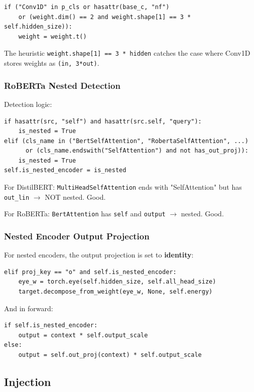 \begin{lstlisting}
if ("Conv1D" in p_cls or hasattr(base_c, "nf")
    or (weight.dim() == 2 and weight.shape[1] == 3 * self.hidden_size)):
    weight = weight.t()
\end{lstlisting}

The heuristic \texttt{weight.shape[1] == 3 * hidden} catches the case where 
Conv1D stores weights as \texttt{(in, 3*out)}.

\subsubsection{RoBERTa Nested Detection}

Detection logic:

\begin{lstlisting}
if hasattr(src, "self") and hasattr(src.self, "query"):
    is_nested = True
elif (cls_name in ("BertSelfAttention", "RobertaSelfAttention", ...)
      or (cls_name.endswith("SelfAttention") and not has_out_proj)):
    is_nested = True
self.is_nested_encoder = is_nested
\end{lstlisting}

For DistilBERT: \texttt{MultiHeadSelfAttention} ends with "SelfAttention" but 
has \texttt{out\_lin} $\to$ NOT nested. Good.

For RoBERTa: \texttt{BertAttention} has \texttt{self} and \texttt{output} $\to$ nested. Good.

\subsubsection{Nested Encoder Output Projection}

For nested encoders, the output projection is set to \textbf{identity}:

\begin{lstlisting}
elif proj_key == "o" and self.is_nested_encoder:
    eye_w = torch.eye(self.hidden_size, self.all_head_size)
    target.decompose_from_weight(eye_w, None, self.energy)
\end{lstlisting}

And in forward:

\begin{lstlisting}
if self.is_nested_encoder:
    output = context * self.output_scale
else:
    output = self.out_proj(context) * self.output_scale
\end{lstlisting}

\subsection{Injection}

